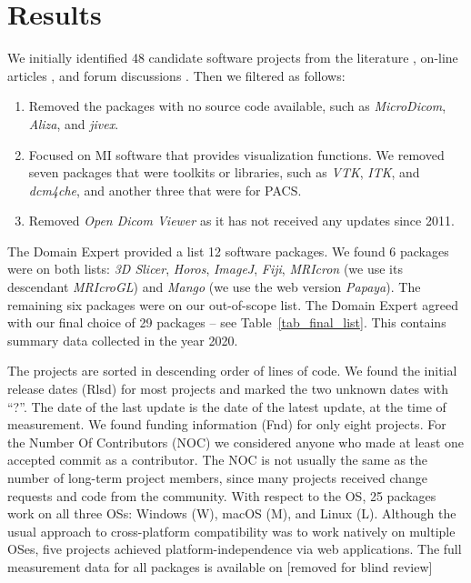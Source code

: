 \documentclass[final, 12pt, 3p, times]{elsarticle}
\begin{document}
\section{Results} \label{ch_results}

We initially identified 48 candidate software projects from the literature
\cite{Bjorn2017, Bruhschwein2019, Haak2015}, on-line articles \cite{Emms2019,
Hasan2020, Mu2019}, and forum discussions \cite{Samala2014}.  Then we filtered
as follows:

\begin{enumerate}

\item Removed the packages with no source code available, such as
\textit{MicroDicom}, \textit{Aliza}, and \textit{jivex}.

\item Focused on MI software that provides visualization functions.  We removed
seven packages that were toolkits or libraries, such as \textit{VTK},
\textit{ITK}, and \textit{dcm4che}, and another three that were for PACS.

\item Removed \textit{Open Dicom Viewer} as it has not received any
updates since 2011.

\end{enumerate}

The Domain Expert provided a list 12 software packages.  We found 6 packages
were on both lists: \textit{3D Slicer}, \textit{Horos}, \textit{ImageJ},
\textit{Fiji}, \textit{MRIcron} (we use its descendant \textit{MRIcroGL}) and
\textit{Mango} (we use the web version \textit{Papaya}).  The remaining six
packages were on our out-of-scope list. The Domain Expert agreed with our final
choice of 29 packages -- see Table~\ref{tab_final_list}. This contains summary
data collected in the year 2020. 

The projects are sorted in descending order of lines of code.  We found the
initial release dates (Rlsd) for most projects and marked the two unknown dates
with ``?''. The date of the last update is the date of the latest update, at the
time of measurement. We found funding information (Fnd) for only eight projects.
For the Number Of Contributors (NOC) we considered anyone who made at least one
accepted commit as a contributor. The NOC is not usually the same as the number
of long-term project members, since many projects received change requests and
code from the community.  With respect to the OS, 25 packages work on all three
OSs: Windows (W), macOS (M), and Linux (L). Although the usual approach to
cross-platform compatibility was to work natively on multiple OSes, five
projects achieved platform-independence via web applications. The full
measurement data for all packages is available on [removed for blind review]
\end{document}
